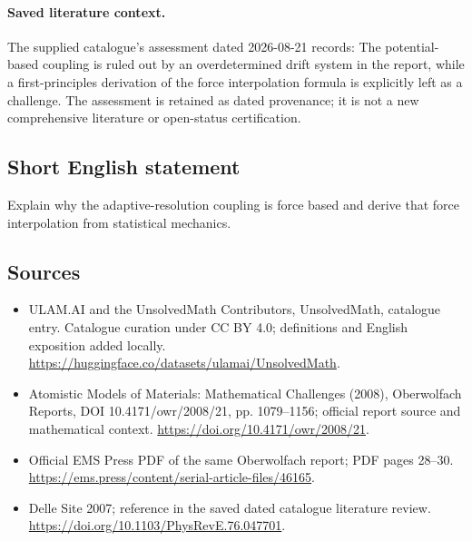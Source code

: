 \documentclass[11pt]{article}
\begin{document}
\paragraph{Saved literature context.} The supplied catalogue's assessment dated 2026-08-21 records: The potential-based coupling is ruled out by an overdetermined drift system in the report, while a first-principles derivation of the force interpolation formula is explicitly left as a challenge. The assessment is retained as dated provenance; it is not a new comprehensive literature or open-status certification.
\subsection{Short English statement}
Explain why the adaptive-resolution coupling is force based and derive that force interpolation from statistical mechanics.
\subsection{Sources}
\begin{itemize}
\item[\hypertarget{source:statement:1}{S1}] ULAM.AI and the UnsolvedMath Contributors, UnsolvedMath, catalogue entry. Catalogue curation under CC BY 4.0; definitions and English exposition added locally.
\url{https://huggingface.co/datasets/ulamai/UnsolvedMath}.
\item[\hypertarget{source:statement:2}{S2}] Atomistic Models of Materials: Mathematical Challenges (2008), Oberwolfach Reports, DOI 10.4171/owr/2008/21, pp. 1079--1156; official report source and mathematical context.
\url{https://doi.org/10.4171/owr/2008/21}.
\item[\hypertarget{source:statement:3}{S3}] Official EMS Press PDF of the same Oberwolfach report; PDF pages 28--30.
\url{https://ems.press/content/serial-article-files/46165}.
\item[\hypertarget{source:statement:4}{S4}] Delle Site 2007; reference in the saved dated catalogue literature review.
\url{https://doi.org/10.1103/PhysRevE.76.047701}.
\end{itemize}
\label{end:statement}
\end{document}
